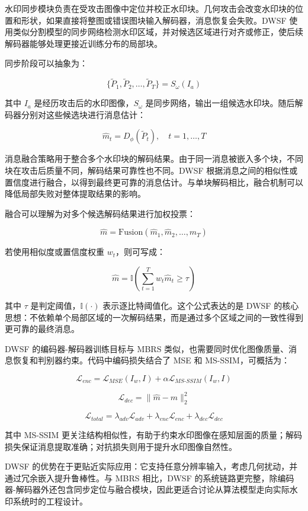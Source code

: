 ﻿\documentclass[UTF8,zihao=5]{ctexart}
\begin{document}
水印同步模块负责在受攻击图像中定位并校正水印块。几何攻击会改变水印块的位置和形状，如果直接将整图或错误图块输入解码器，消息恢复会失败。DWSF 使用类似分割模型的同步网络检测水印区域，并对候选区域进行对齐或修正，使后续解码器能够处理更接近训练分布的局部块。

同步阶段可以抽象为：

\[
\{\tilde{P}_1,\tilde{P}_2,\ldots,\tilde{P}_T\}
=S_{\omega}(I_a)
\]

其中 \(I_a\) 是经历攻击后的水印图像，\(S_{\omega}\) 是同步网络，输出一组候选水印块。随后解码器分别对这些候选块进行消息估计：

\[
\hat{m}_t=D_{\phi}(\tilde{P}_t),\quad t=1,\ldots,T
\]

消息融合策略用于整合多个水印块的解码结果。由于同一消息被嵌入多个块，不同块在攻击后质量不同，解码结果可靠性也不同。DWSF 根据消息之间的相似性或置信度进行融合，以得到最终更可靠的消息估计。与单块解码相比，融合机制可以降低局部失败对整体提取结果的影响。

融合可以理解为对多个候选解码结果进行加权投票：

\[
\hat{m}=\mathrm{Fusion}(\hat{m}_1,\hat{m}_2,\ldots,\hat{m}_T)
\]

若使用相似度或置信度权重 \(w_t\)，则可写成：

\[
\hat{m}=\mathbb{I}\left(\sum_{t=1}^{T}w_t\hat{m}_t \geq \tau \right)
\]

其中 \(\tau\) 是判定阈值，\(\mathbb{I}(\cdot)\) 表示逐比特阈值化。这个公式表达的是 DWSF 的核心思想：不依赖单个局部区域的一次解码结果，而是通过多个区域之间的一致性得到更可靠的最终消息。

DWSF 的编码器-解码器训练目标与 MBRS 类似，也需要同时优化图像质量、消息恢复和判别器约束。代码中编码损失结合了 MSE 和 MS-SSIM，可概括为：

\[
\mathcal{L}_{enc}
=\mathcal{L}_{MSE}(I_w,I)
+\alpha\mathcal{L}_{MS\text{-}SSIM}(I_w,I)
\]

\[
\mathcal{L}_{dec}=\|\hat{m}-m\|_2^2
\]

\[
\mathcal{L}_{total}
=\lambda_{adv}\mathcal{L}_{adv}
+\lambda_{enc}\mathcal{L}_{enc}
+\lambda_{dec}\mathcal{L}_{dec}
\]

其中 MS-SSIM 更关注结构相似性，有助于约束水印图像在感知层面的质量；解码损失保证消息提取准确；对抗损失则用于提升水印图像自然性。

DWSF 的优势在于更贴近实际应用：它支持任意分辨率输入，考虑几何扰动，并通过冗余嵌入提升鲁棒性。与 MBRS 相比，DWSF 的系统链路更完整，除编码器-解码器外还包含同步定位与融合模块，因此更适合讨论从算法模型走向实际水印系统时的工程设计。
\end{document}
